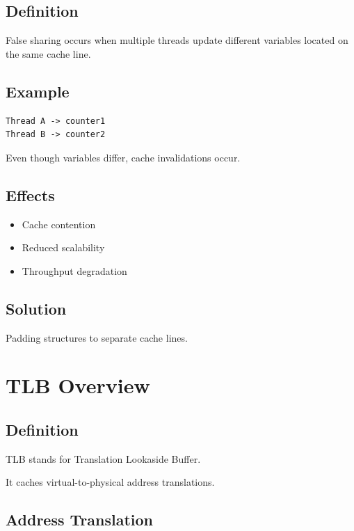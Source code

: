 \subsection{Definition}

False sharing occurs when multiple threads update different variables located on the same cache line.

\subsection{Example}

\begin{verbatim}
Thread A -> counter1
Thread B -> counter2
\end{verbatim}

Even though variables differ, cache invalidations occur.

\subsection{Effects}

\begin{itemize}
\item Cache contention
\item Reduced scalability
\item Throughput degradation
\end{itemize}

\subsection{Solution}

Padding structures to separate cache lines.

\section{TLB Overview}

\subsection{Definition}

TLB stands for Translation Lookaside Buffer.

It caches virtual-to-physical address translations.

\subsection{Address Translation}

